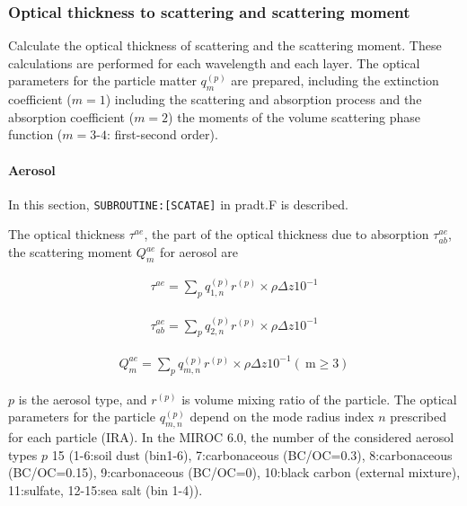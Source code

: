 \hypertarget{optical-thickness-to-scattering-and-scattering-moment}{%
\subsubsection{Optical thickness to scattering and scattering
moment}\label{optical-thickness-to-scattering-and-scattering-moment}}

Calculate the optical thickness of scattering and the scattering moment.
These calculations are performed for each wavelength and each layer. The
optical parameters for the particle matter \(q_{m}^{(p)}\) are prepared,
including the extinction coefficient (\(m = 1\)) including the
scattering and absorption process and the absorption coefficient
(\(m = 2\)) the moments of the volume scattering phase function
(\(m=3\text{-}4\): first-second order).

\hypertarget{aerosol}{%
\paragraph{Aerosol}\label{aerosol}}

In this section, \texttt{SUBROUTINE:{[}SCATAE{]}} in pradt.F is
described.

The optical thickness \(\tau^{a e}\), the part of the optical thickness
due to absorption \(\tau_{ab}^{a e}\), the scattering moment
\(Q_{m}^{a e}\) for aerosol are

\begin{eqnarray}
\tau^{a e}=\sum_{p} q_{1, n}^{(p)} r^{(p)} \times \rho \Delta z 10^{-1}
\end{eqnarray}

\begin{eqnarray}
\tau_{ab}^{a e}=\sum_{p} q_{2, n}^{(p)} r^{(p)} \times \rho \Delta z 10^{-1}
\end{eqnarray}

\begin{eqnarray}
Q_{m}^{a e}=\sum_{p} q_{m, n}^{(p)} r^{(p)} \times \rho \Delta z 10^{-1} (\mathrm{~m} \geq 3)
\end{eqnarray}

\(p\) is the aerosol type, and \(r^{(p)}\) is volume mixing ratio of the
particle. The optical parameters for the particle \(q_{m, n}^{(p)}\)
depend on the mode radius index \(n\) prescribed for each particle
(IRA). In the MIROC 6.0, the number of the considered aerosol types
\(p\) 15 (1-6:soil dust (bin1-6), 7:carbonaceous (BC/OC=0.3),
8:carbonaceous (BC/OC=0.15), 9:carbonaceous (BC/OC=0), 10:black carbon
(external mixture), 11:sulfate, 12-15:sea salt (bin 1-4)).

